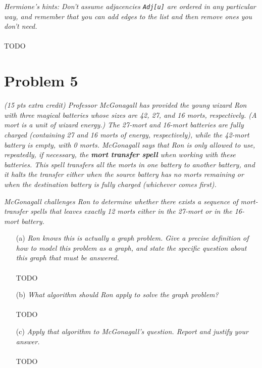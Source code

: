 \documentclass[12pt]{article} \setlength{\oddsidemargin}{0in}
\begin{document}
\textit{Hermione’s hints: Don’t assume adjacencies \texttt{Adj[u]} are
  ordered in any particular way, and remember that you can add edges
  to the list and then remove ones you don't need.}
\\\\
TODO

\newpage


\section*{Problem 5}

\textit{(15 pts extra credit) Professor McGonagall has provided the
  young wizard Ron with three magical batteries whose sizes are 42,
  27, and 16 morts, respectively. (A mort is a unit of wizard energy.)
  The 27-mort and 16-mort batteries are fully charged (containing 27
  and 16 morts of energy, respectively), while the 42-mort battery is
  empty, with 0 morts. McGonagall says that Ron is only allowed to
  use, repeatedly, if necessary, the \textbf{mort transfer spell} when
  working with these batteries. This spell transfers all the morts in
  one battery to another battery, and it halts the transfer either
  when the source battery has no morts remaining or when the
  destination battery is fully charged (whichever comes first).}

\textit{McGonagall challenges Ron to determine whether there exists a
  sequence of mort-transfer spells that leaves exactly 12 morts either
  in the 27-mort or in the 16-mort battery.}

\begin{enumerate}
\item[(a)]{\textit{Ron knows this is actually a graph problem. Give a
      precise definition of how to model this problem as a graph, and
      state the specific question about this graph that must be
      answered.}}
  \\\\
  TODO
  \\
\item[(b)]{\textit{What algorithm should Ron apply to solve the graph
      problem?}}
  \\\\
  TODO
  \\
\item[(c)]{\textit{Apply that algorithm to McGonagall’s
      question. Report and justify your answer.}}
  \\\\
  TODO

\end{enumerate}
  
\end{document}
